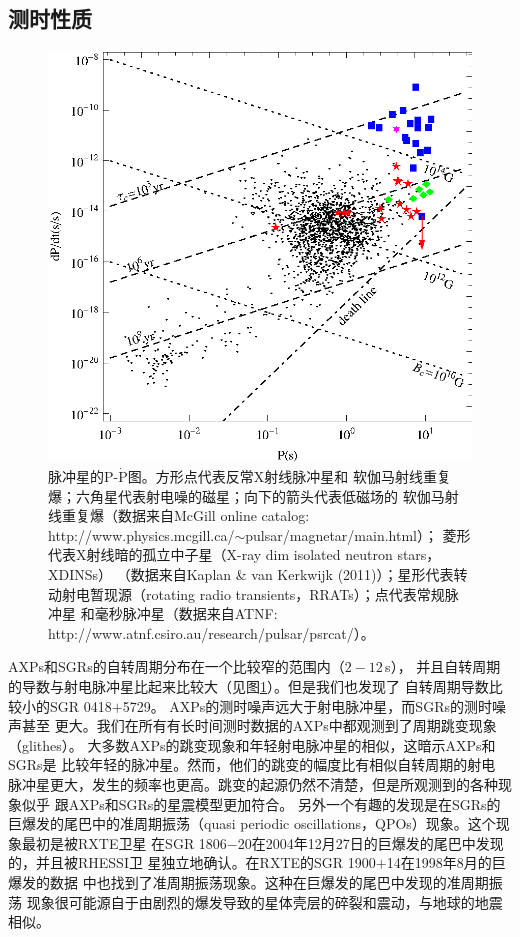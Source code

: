 \subsection{测时性质}

\begin{figure}
\centering
\includegraphics[width=12cm]{PPdot.eps}
\caption{脉冲星的P-$\mathrm{\dot{P}}$图\supercite{tx11}。方形点代表反常X射线脉冲星和
软伽马射线重复爆；六角星代表射电噪的磁星；向下的箭头代表低磁场的
软伽马射线重复爆（数据来自McGill online catalog:
http://www.physics.mcgill.ca/$\sim$pulsar/magnetar/main.html）；
菱形代表X射线暗的孤立中子星（X-ray dim isolated neutron stars，XDINSs）
（数据来自Kaplan \& van Kerkwijk (2011)\supercite{kv11}）；星形代表转
动射电暂现源（rotating radio transients，RRATs）；点代表常规脉冲星
和毫秒脉冲星（数据来自ATNF: http://www.atnf.csiro.au/research/pulsar/psrcat/）。}
\label{PPdot}
\end{figure}

AXPs和SGRs的自转周期分布在一个比较窄的范围内（$2-12$\,s），
并且自转周期的导数与射电脉冲星比起来比较大（见图\ref{PPdot}）。但是我们也发现了
自转周期导数比较小的SGR 0418$+$5729\supercite{ret10}。
%
AXPs的测时噪声远大于射电脉冲星，而SGRs的测时噪声甚至
更大。我们在所有有长时间测时数据的AXPs中都观测到了周期跳变现象（glithes）。
大多数AXPs的跳变现象和年轻射电脉冲星的相似，这暗示AXPs和SGRs是
比较年轻的脉冲星。然而，他们的跳变的幅度比有相似自转周期的射电
脉冲星更大，发生的频率也更高。跳变的起源仍然不清楚，但是所观测到的各种现象似乎
跟AXPs和SGRs的星震模型更加符合\supercite{m08}。
%
另外一个有趣的发现是在SGRs的巨爆发的尾巴中的准周期振荡（quasi 
periodic oscillations，QPOs）现象。这个现象最初是被RXTE卫星
在SGR 1806$-$20在2004年12月27日的巨爆发的尾巴中发现的\supercite{ibs05}，并且被RHESSI卫
星独立地确认\supercite{ws06}。在RXTE的SGR 1900$+$14在1998年8月的巨爆发的数据
中也找到了准周期振荡现象\supercite{sw05}。这种在巨爆发的尾巴中发现的准周期振荡
现象很可能源自于由剧烈的爆发导致的星体壳层的碎裂和震动，与地球的地震相似\supercite{m08}。

